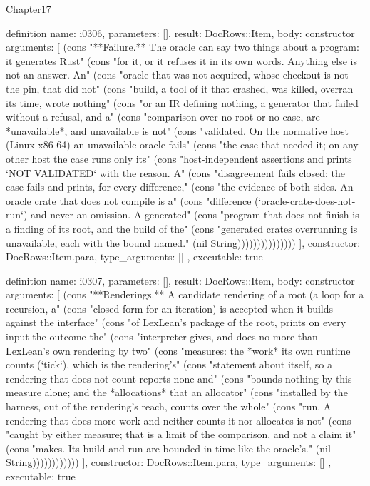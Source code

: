 \begin{lexlean}{Chapter17}
\begin{semanticmodule}
definition{
  name: i0306,
  parameters: [],
  result: DocRows::Item,
  body: constructor{
    arguments: [
      (cons "**Failure.** The oracle can say two things about a program: it generates Rust" (cons "for it, or it refuses it in its own words. Anything else is not an answer. An" (cons "oracle that was not acquired, whose checkout is not the pin, that did not" (cons "build, a tool of it that crashed, was killed, overran its time, wrote nothing" (cons "or an IR defining nothing, a generator that failed without a refusal, and a" (cons "comparison over no root or no case, are *unavailable*, and unavailable is not" (cons "validated. On the normative host (Linux x86-64) an unavailable oracle fails" (cons "the case that needed it; on any other host the case runs only its" (cons "host-independent assertions and prints `NOT VALIDATED` with the reason. A" (cons "disagreement fails closed: the case fails and prints, for every difference," (cons "the evidence of both sides. An oracle crate that does not compile is a" (cons "difference (`oracle-crate-does-not-run`) and never an omission. A generated" (cons "program that does not finish is a finding of its root, and the build of the" (cons "generated crates overrunning is unavailable, each with the bound named." (nil String)))))))))))))))
    ],
    constructor: DocRows::Item.para,
    type_arguments: []
  },
  executable: true
}

definition{
  name: i0307,
  parameters: [],
  result: DocRows::Item,
  body: constructor{
    arguments: [
      (cons "**Renderings.** A candidate rendering of a root (a loop for a recursion, a" (cons "closed form for an iteration) is accepted when it builds against the interface" (cons "of LexLean's package of the root, prints on every input the outcome the" (cons "interpreter gives, and does no more than LexLean's own rendering by two" (cons "measures: the *work* its own runtime counts (`tick`), which is the rendering's" (cons "statement about itself, so a rendering that does not count reports none and" (cons "bounds nothing by this measure alone; and the *allocations* that an allocator" (cons "installed by the harness, out of the rendering's reach, counts over the whole" (cons "run. A rendering that does more work and neither counts it nor allocates is not" (cons "caught by either measure; that is a limit of the comparison, and not a claim it" (cons "makes. Its build and run are bounded in time like the oracle's." (nil String))))))))))))
    ],
    constructor: DocRows::Item.para,
    type_arguments: []
  },
  executable: true
}


\end{semanticmodule}
\end{lexlean}
